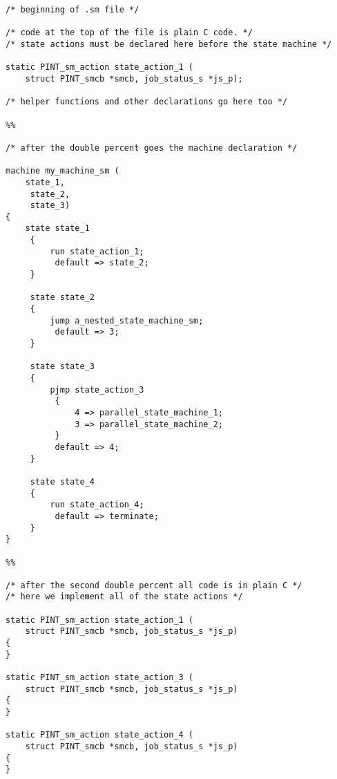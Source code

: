 \begin{verbatim}
/* beginning of .sm file */

/* code at the top of the file is plain C code. */
/* state actions must be declared here before the state machine */

static PINT_sm_action state_action_1 (
    struct PINT_smcb *smcb, job_status_s *js_p);

/* helper functions and other declarations go here too */

%%

/* after the double percent goes the machine declaration */

machine my_machine_sm (
    state_1,
	 state_2,
	 state_3)
{
    state state_1
	 {
	     run state_action_1;
		  default => state_2;
	 }

	 state state_2
	 {
	     jump a_nested_state_machine_sm;
		  default => 3;
	 }

	 state state_3
	 {
	     pjmp state_action_3
		  {
		      4 => parallel_state_machine_1;
		      3 => parallel_state_machine_2;
		  }
		  default => 4;
	 }

	 state state_4
	 {
	     run state_action_4;
		  default => terminate;
	 }
}

%%

/* after the second double percent all code is in plain C */
/* here we implement all of the state actions */

static PINT_sm_action state_action_1 (
    struct PINT_smcb *smcb, job_status_s *js_p)
{
}

static PINT_sm_action state_action_3 (
    struct PINT_smcb *smcb, job_status_s *js_p)
{
}

static PINT_sm_action state_action_4 (
    struct PINT_smcb *smcb, job_status_s *js_p)
{
}

\end{verbatim}


